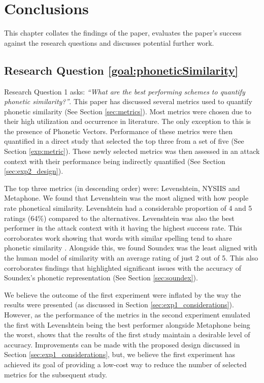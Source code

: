 \chapter{Conclusions}
This chapter collates the findings of the paper, evaluates the paper's success against the research questions and discusses potential further work.

\section{Research Question \ref{goal:phoneticSimilarity}}

Research Question 1 asks: \textit{“What are the best performing schemes to quantify phonetic similarity?”}. This paper has discussed several metrics used to quantify phonetic similarity (See Section \ref{sec:metrics}). Most metrics were chosen due to their high utilization and occurrence in literature. The only exception to this is the presence of Phonetic Vectors. Performance of these metrics were then quantified in a direct study that selected the top three from a set of five (See Section \ref{exp:metric}). These newly selected metrics was then assessed in an attack context with their performance being indirectly quantified (See Section \ref{sec:exp2_design}).

The top three metrics (in descending order) were: Levenshtein, NYSIIS and Metaphone. We found that Levenshtein was the most aligned with how people rate phonetical similarity. Levenshtein had a considerable proportion of 4 and 5 ratings (64\%) compared to the alternatives. Levenshtein was also the best performer in the attack context with it having the highest success rate. This corroborates work showing that words with similar spelling tend to share phonetic similarity \cite{hettiarachchi2012sparcl}.
Alongside this, we found Soundex was the least aligned with the human model of similarity with an average rating of just 2 out of 5. This also corroborates findings that highlighted significant issues with the accuracy of Soundex’s phonetic representation (See Section \ref{sec:soundex}).

We believe the outcome of the first experiment were inflated by the way the results were presented (as discussed in Section \ref{sec:exp1_considerations}). However, as the performance of the metrics in the second experiment emulated the first with Levenshtein being the best performer alongside Metaphone being the worst, shows that the results of the first study maintain a desirable level of accuracy. Improvements can be made with the proposed design discussed in Section \ref{sec:exp1_considerations}, but, we believe the first experiment has achieved its goal of providing a low-cost way to reduce the number of selected metrics for the subsequent study.

